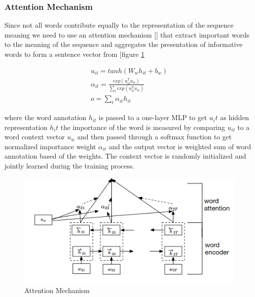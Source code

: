 \documentclass{article}
\begin{document}
    \subsubsection{Attention Mechanism}
    Since not all words contribute equally to the representation of the sequence meaning we need to use an attention mechanism [\cite{yang2016hierarchical}] that extract important words to the meaning of the sequence and aggregates the presentation of informative words to form a sentence vector from [figure \ref{fig:attention}

    \begin{align}
        u_{it} = tanh(W_w h_{it} + b_w) \\
        \alpha_{it} = \frac{exp(u_{it}^T u_w)}{\sum_t exp(u_{it}^T u_w)} \\
        o = \sum_t \alpha_{it}h_{it}
    \end{align}

    where the word annotation $h_{it}$ is passed to a one-layer MLP to get $u_it$ as hidden representation $h_it$  the importance of the word is measured by comparing $u_{it}$ to a word context vector $u_w$ and then passed through a softmax function to get normalized importance weight $\alpha_{it}$ and the output vector is weighted sum of word annotation based of the weights. The context vector is randomly initialized and jointly learned during the training process.

    \begin{figure}
        \centering
        \includegraphics[scale=0.7]{attention.png}
        \caption{Attention Mechanism \cite{yang2016hierarchical}}
        \label{fig:attention}
    \end{figure}
\end{document}

